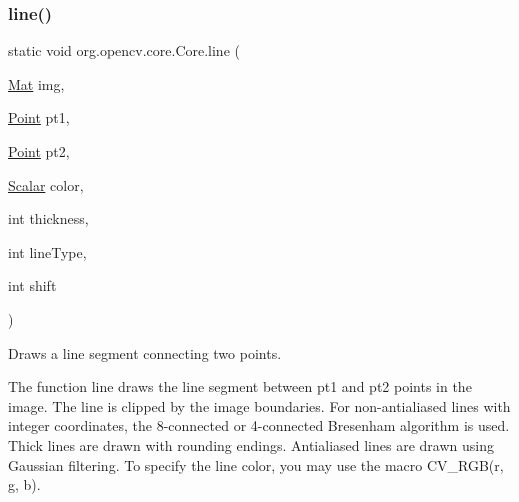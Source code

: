 \subsubsection{\texorpdfstring{line()}{line()}\hspace{0.1cm}{\footnotesize\ttfamily [1/3]}}
{\footnotesize\ttfamily static void org.\+opencv.\+core.\+Core.\+line (\begin{DoxyParamCaption}\item[{\mbox{\hyperlink{classorg_1_1opencv_1_1core_1_1_mat}{Mat}}}]{img,  }\item[{\mbox{\hyperlink{classorg_1_1opencv_1_1core_1_1_point}{Point}}}]{pt1,  }\item[{\mbox{\hyperlink{classorg_1_1opencv_1_1core_1_1_point}{Point}}}]{pt2,  }\item[{\mbox{\hyperlink{classorg_1_1opencv_1_1core_1_1_scalar}{Scalar}}}]{color,  }\item[{int}]{thickness,  }\item[{int}]{line\+Type,  }\item[{int}]{shift }\end{DoxyParamCaption})\hspace{0.3cm}{\ttfamily [static]}}

Draws a line segment connecting two points.

The function {\ttfamily line} draws the line segment between {\ttfamily pt1} and {\ttfamily pt2} points in the image. The line is clipped by the image boundaries. For non-\/antialiased lines with integer coordinates, the 8-\/connected or 4-\/connected Bresenham algorithm is used. Thick lines are drawn with rounding endings. Antialiased lines are drawn using Gaussian filtering. To specify the line color, you may use the macro {\ttfamily C\+V\+\_\+\+R\+G\+B(r, g, b)}.


